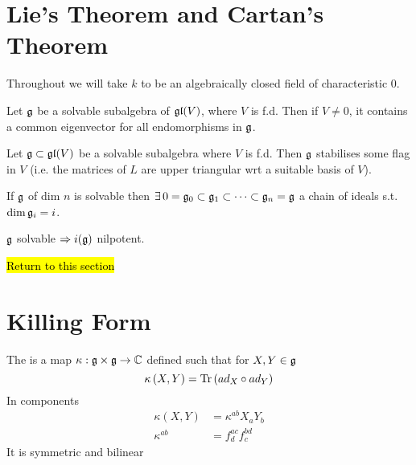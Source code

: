\documentclass{article}
\begin{document}
\section{Lie's Theorem and Cartan's Theorem}
\begin{notation}
	Throughout we will take $k$ to be an algebraically closed field of characteristic 0. 
\end{notation}

\begin{theorem}
	Let $\mathfrak{g}$ be a solvable subalgebra of $\mathfrak{gl}(V)$, where $V$ is f.d. Then if $V \neq 0$, it contains a common eigenvector for all endomorphisms in $\mathfrak{g}$. 
\end{theorem}
\begin{corollary}
	Let $\mathfrak{g}\subset \mathfrak{gl}(V)$ be a solvable subalgebra where $V$ is f.d. Then $\mathfrak{g}$ stabilises some flag in $V$ (i.e. the matrices of $L$ are upper triangular wrt a suitable basis of $V$). 
\end{corollary}

\begin{corollary}
	If $\mathfrak{g}$ of dim $n$ is solvable then $\exists \,  0 = \mathfrak{g}_0 \subset \mathfrak{g}_1 \subset \dots \subset \mathfrak{g}_n=\mathfrak{g}$ a chain of ideals s.t. $\dim \mathfrak{g}_i = i$. 
\end{corollary}

\begin{corollary}
	$\mathfrak{g}$ solvable $\Rightarrow i(\mathfrak{g})$ nilpotent. 
\end{corollary}

\hl{Return to this section}

\section{Killing Form}
\begin{definition}
	The  is a map $\kappa:\mathfrak{g}\times\mathfrak{g}\to\mathbb{C}$ defined such that for $X,Y\in\mathfrak{g}$
	\[
	\kappa\left(X,Y\right)=\operatorname{Tr}\left(ad_X \circ ad_Y\right)
	\]
	In components 
	\begin{align*}
	\kappa(X,Y) &= \kappa^{ab}X_a Y_b \\
	\kappa^{ab} &= f^{ac}_d f^{bd}_c
	\end{align*}
	It is symmetric and bilinear 
\end{definition}
\end{document}

